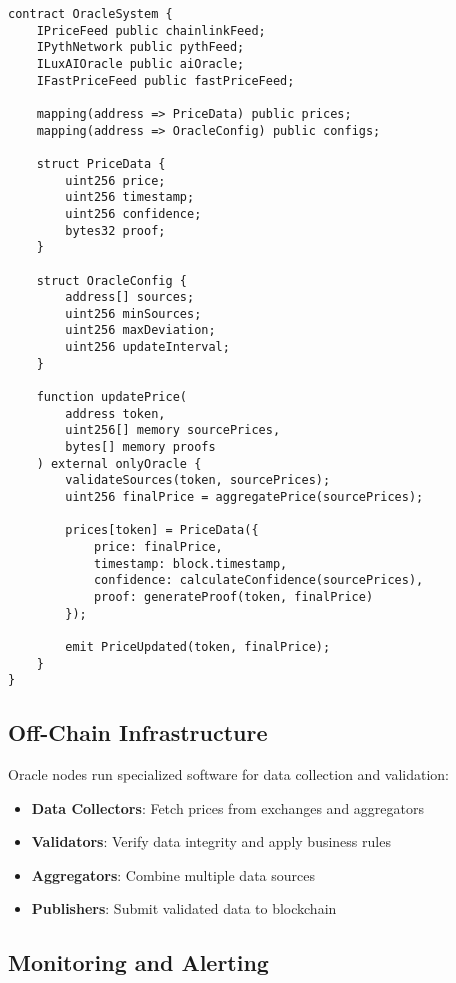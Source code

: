 \documentclass[11pt]{article}
\begin{document}
\begin{lstlisting}[caption={Oracle System Architecture}]
contract OracleSystem {
    IPriceFeed public chainlinkFeed;
    IPythNetwork public pythFeed;
    ILuxAIOracle public aiOracle;
    IFastPriceFeed public fastPriceFeed;
    
    mapping(address => PriceData) public prices;
    mapping(address => OracleConfig) public configs;
    
    struct PriceData {
        uint256 price;
        uint256 timestamp;
        uint256 confidence;
        bytes32 proof;
    }
    
    struct OracleConfig {
        address[] sources;
        uint256 minSources;
        uint256 maxDeviation;
        uint256 updateInterval;
    }
    
    function updatePrice(
        address token,
        uint256[] memory sourcePrices,
        bytes[] memory proofs
    ) external onlyOracle {
        validateSources(token, sourcePrices);
        uint256 finalPrice = aggregatePrice(sourcePrices);
        
        prices[token] = PriceData({
            price: finalPrice,
            timestamp: block.timestamp,
            confidence: calculateConfidence(sourcePrices),
            proof: generateProof(token, finalPrice)
        });
        
        emit PriceUpdated(token, finalPrice);
    }
}
\end{lstlisting}

\subsection{Off-Chain Infrastructure}

Oracle nodes run specialized software for data collection and validation:

\begin{itemize}
    \item \textbf{Data Collectors}: Fetch prices from exchanges and aggregators
    \item \textbf{Validators}: Verify data integrity and apply business rules
    \item \textbf{Aggregators}: Combine multiple data sources
    \item \textbf{Publishers}: Submit validated data to blockchain
\end{itemize}

\subsection{Monitoring and Alerting}
\end{document}
